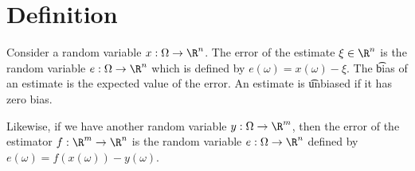 

\section*{Definition}

Consider a random variable $x: \Omega  \to \R ^n$.
The error of the estimate $\xi  \in \R ^n$ is the random variable $e: \Omega  \to \R ^n$ which is defined by $e(\omega ) = x(\omega ) - \xi $.
The \t{bias} of an estimate is the expected value of the error.
An estimate is \t{unbiased} if it has zero bias.

Likewise, if we have another random variable $y: \Omega  \to \R ^m$, then the error of the estimator $f: \R ^m \to \R ^n$ is the random variable $e: \Omega  \to \R ^n$ defined by $e(\omega ) = f(x(\omega )) - y(\omega )$.

\blankpage